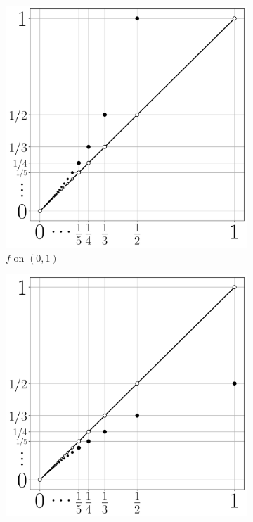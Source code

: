 \documentclass{lew98_solutions}
\begin{document}
\begin{solution}
\begin{enumerate}
        \begin{figure}[H]
            \centering
            \begin{subfigure}{0.49\textwidth}
                \includegraphics[width=\textwidth]{UA_Figures/UA_ex1_5_4_fig_3_a.pdf}
                \caption{\( f \) on \( (0, 1) \)}
            \end{subfigure}
            \begin{subfigure}{0.49\textwidth}
                \includegraphics[width=\textwidth]{UA_Figures/UA_ex1_5_4_fig_3_b.pdf}

\end{subfigure}
\end{figure}
\end{enumerate}
\end{solution}
\end{document}
